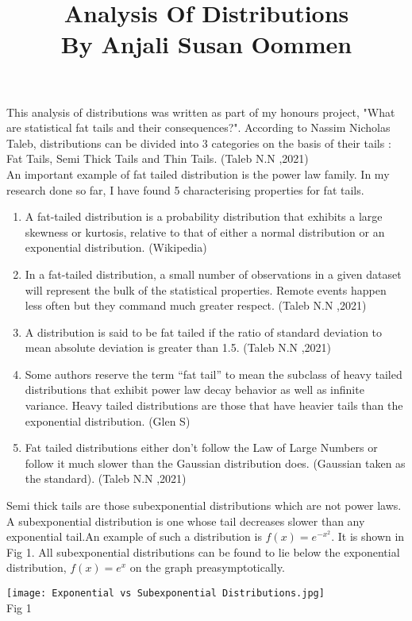 \documentclass[14pt, a4paper]{article}
\title{Analysis Of Distributions \\ By Anjali Susan Oommen}
\date{}
\theoremstyle{definition}
\begin{document}
\maketitle

This analysis of distributions was written as part of my honours project, "What are statistical fat tails and their consequences?". According to Nassim Nicholas Taleb, distributions can be divided into $3$ categories on the basis of their tails : Fat Tails, Semi Thick Tails and Thin Tails. (Taleb N.N ,2021)
\\ An important example of fat tailed distribution is the power law family. In my research done so far, I have found 5 characterising properties for fat tails.
\begin{enumerate}
\item A fat-tailed distribution is a probability distribution that exhibits a large skewness or kurtosis, relative to that of either a normal distribution or an exponential distribution. (Wikipedia)
\item In a fat-tailed distribution, a small number of observations in a given dataset will represent the bulk of the statistical properties. Remote events happen less often but they command much greater respect. (Taleb N.N ,2021)
\item A distribution is said to be fat tailed if the ratio of standard deviation to mean absolute deviation is greater than 1.5. (Taleb N.N ,2021)
\item Some authors reserve the term “fat tail” to mean the subclass of heavy tailed distributions that exhibit power law decay behavior as well as infinite variance. Heavy tailed distributions are those that have heavier tails than the exponential distribution. (Glen S)
\item Fat tailed distributions either don’t follow the Law of Large Numbers or follow it much slower than the Gaussian distribution does. (Gaussian taken as the standard). (Taleb N.N ,2021)
\end{enumerate}
Semi thick tails are those subexponential distributions which are not power laws. A subexponential distribution is one whose tail decreases slower than any exponential tail.An example of such a distribution is $f(x) = e^{-x^2}$.  It is shown in Fig 1. All subexponential distributions can be found to lie below the exponential distribution, $f(x) = e^x$ on the graph preasymptotically.


\begin{center}
    \texttt{[image: Exponential vs Subexponential Distributions.jpg]}
    \\ Fig 1
\end{center}
\end{document}
